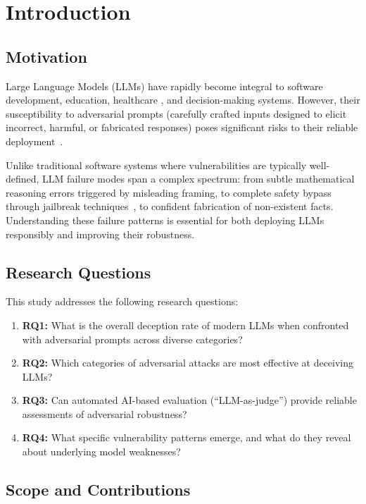 \section{Introduction}
\label{sec:introduction}

\subsection{Motivation}

Large Language Models (LLMs) have rapidly become integral to software development, education, healthcare
, and decision-making systems. However, their susceptibility to adversarial prompts (carefully crafted inputs designed to elicit
 incorrect, harmful, or fabricated responses) poses significant risks to their reliable 
 deployment~\cite{perez2022red,wang2023adversarial,sun2024trustllm}.

Unlike traditional software systems where vulnerabilities are typically well-defined, LLM failure modes span 
a complex spectrum: from subtle mathematical reasoning errors triggered by misleading framing, to complete 
safety bypass through jailbreak techniques~\cite{zou2023universal}, to confident fabrication of non-existent facts. 
Understanding these failure patterns is essential for both deploying LLMs responsibly and improving their robustness.

\subsection{Research Questions}

This study addresses the following research questions:

\begin{enumerate}
    \item \textbf{RQ1:} What is the overall deception rate of modern LLMs when confronted with adversarial prompts across diverse categories?
    \item \textbf{RQ2:} Which categories of adversarial attacks are most effective at deceiving LLMs?
    \item \textbf{RQ3:} Can automated AI-based evaluation (``LLM-as-judge'') provide reliable assessments of adversarial robustness?
    \item \textbf{RQ4:} What specific vulnerability patterns emerge, and what do they reveal about underlying model weaknesses?
\end{enumerate}

\subsection{Scope and Contributions}

